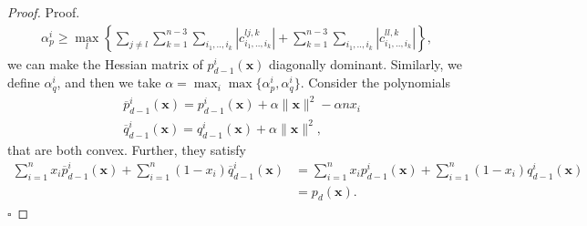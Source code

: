 \documentclass[opre,nonblindrev]{informs3} %
\begin{document}
\begin{appendices}
\begin{proof}{Proof. }
\begin{align*}
    \alpha_p^i \ge \max_l \left\{ \sum_{j \neq l} \sum_{k=1}^{n-3} \sum_{i_1,..,i_k} \left \lvert c_{i_1,..,i_k}^{lj, k} \right \rvert + \sum_{k=1}^{n-3} \sum_{i_1,..,i_k} \left \lvert c_{i_1,..,i_k}^{ll, k} \right \rvert \right\},
\end{align*}
we can make the Hessian matrix of $p_{d-1}^i(\boldsymbol{x})$ diagonally dominant. Similarly, we define $\alpha_q^i$, and then we take $\alpha = \max_i \max\{\alpha_p^i, \alpha_q^i\}$. Consider the polynomials
\begin{align*}
    & \overline{p}_{d-1}^i(\boldsymbol{x}) = p_{d-1}^i(\boldsymbol{x}) + \alpha \|\boldsymbol{x}\|^2 - \alpha n x_i  \\
    & \overline{q}_{d-1}^i(\boldsymbol{x}) = q_{d-1}^i(\boldsymbol{x}) + \alpha \|\boldsymbol{x}\|^2,
\end{align*}     
that are both convex. Further, they satisfy
\begin{align*}
    \sum_{i=1}^n x_i\overline{p}_{d-1}^i(\boldsymbol{x}) + \sum_{i=1}^n (1-x_i) \overline{q}_{d-1}^i(\boldsymbol{x}) &= \sum_{i=1}^n x_ip_{d-1}^i(\boldsymbol{x}) + \sum_{i=1}^n (1-x_i) q_{d-1}^i(\boldsymbol{x}) \\ 
    &= p_d(\boldsymbol{x}).
\end{align*} \hfill $\square$
\end{proof} 

\end{appendices}

	
	
	
\end{document}
